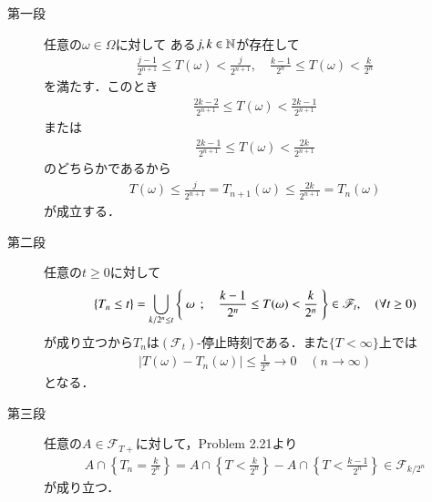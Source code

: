 	\begin{prf}\mbox{}
		\begin{description}
			\item[第一段]
				任意の$\omega \in \Omega$に対して
				ある$j,k \in \mathbb{N}$が存在して
				\begin{align}
					\frac{j-1}{2^{n+1}} \leq T(\omega) < \frac{j}{2^{n+1}},
					\quad \frac{k-1}{2^n} \leq T(\omega) < \frac{k}{2^n}
				\end{align}
				を満たす．このとき
				\begin{align}
					\frac{2k-2}{2^{n+1}} \leq T(\omega) < \frac{2k-1}{2^{n+1}}
				\end{align}
				または
				\begin{align}
					\frac{2k-1}{2^{n+1}} \leq T(\omega) < \frac{2k}{2^{n+1}}
				\end{align}
				のどちらかであるから
				\begin{align}
					T(\omega) \leq \frac{j}{2^{n+1}} = T_{n+1}(\omega)
					\leq \frac{2k}{2^{n+1}} = T_n(\omega)
				\end{align}
				が成立する．
			
			\item[第二段]
				任意の$t \geq 0$に対して
				\begin{align}
					\{T_n \leq t\}
					= \bigcup_{k/2^n \leq t} \left\{\ \omega\ \, ; \quad \frac{k-1}{2^n} \leq T(\omega) < \frac{k}{2^n}\ \right\}
					\in \mathscr{F}_t,
					\quad (\forall t \geq 0)
				\end{align}
				が成り立つから$T_n$は$(\mathscr{F}_t)$-停止時刻である．また$\{T < \infty\}$上では
				\begin{align}
					|T(\omega) - T_n(\omega)| \leq \frac{1}{2^n} \longrightarrow 0
					\quad (n \longrightarrow \infty)
				\end{align}
				となる．
			
			\item[第三段]
				任意の$A \in \mathscr{F}_{T+}$に対して，Problem 2.21より
				\begin{align}
					A \cap \left\{T_n = \frac{k}{2^n}\right\}
					= A \cap \left\{T < \frac{k}{2^n}\right\}
					- A \cap \left\{T < \frac{k-1}{2^n}\right\}
					\in \mathscr{F}_{k/2^n}
				\end{align}
				が成り立つ．
				\QED
		\end{description}
	\end{prf}
